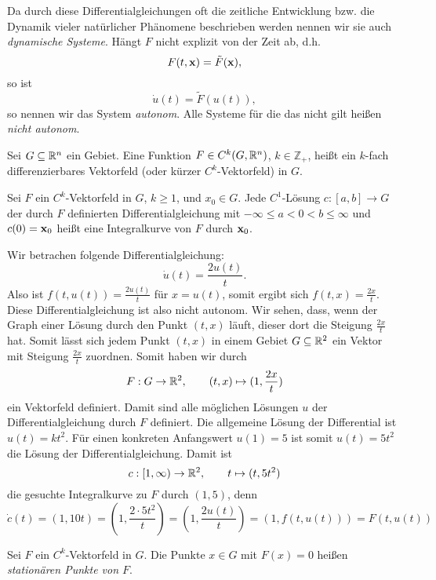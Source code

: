 \documentclass[
pdftex,
oneside,
headsepline,
11pt, 
]{scrreprt}
\begin{document}
\begin{de}
	Da durch diese Differentialgleichungen oft die zeitliche Entwicklung bzw. die Dynamik vieler natürlicher Phänomene beschrieben werden nennen wir sie auch \textit{dynamische Systeme}. Hängt $F$ nicht explizit von der Zeit ab, d.h. \[ F(t,\textnormal{\textbf{x}})=\tilde{F}(\textnormal{\textbf{x}}), \] so ist \[ \dot{u}(t)=\tilde{F}(u(t)),  \] so nennen wir das System \textit{autonom}. Alle Systeme für die das nicht gilt heißen \textit{nicht autonom}.
\end{de}
\begin{de}[$C^k$-Vektorfeld]
	Sei $G\subseteq \mathbb{R}^n$ ein Gebiet. Eine Funktion $F\in C^k(G,\mathbb{R}^n)$, $k\in \mathbb{Z}_+$, heißt ein $k$-fach differenzierbares Vektorfeld (oder kürzer $C^k$-Vektorfeld) in $G$.
\end{de}
\begin{de}[Integralkurve]
Sei $F$ ein $C^k$-Vektorfeld in $G$, $k\geq 1$, und $x_0\in G$. Jede $C^1$-Lösung $c:[a,b]\to G$ der durch $F$ definierten Differentialgleichung mit $-\infty\leq a<0<b\leq \infty$ und $c(0)=\textnormal{\textbf{x}}_0$ heißt eine Integralkurve von $F$ durch $\textnormal{\textbf{x}}_0$.
\end{de}
\begin{bsp}
	Wir betrachen folgende Differentialgleichung:
	\[  \dot{u}(t)= \frac{2u(t)}{t}.\] Also ist $f(t,u(t))=\frac{2u(t)}{t}$ für $x=u(t)$, somit ergibt sich $f(t,x)=\frac{2x}{t}$. Diese Differentialgleichung ist also nicht autonom. Wir sehen, dass, wenn der Graph einer Lösung durch den Punkt $(t,x)$ läuft, dieser dort die Steigung $\frac{2x}{t}$ hat. Somit lässt sich jedem Punkt $(t,x)$ in einem Gebiet $G\subseteq\mathbb{R}^2$ ein Vektor mit Steigung $\frac{2x}{t}$ zuordnen. Somit haben wir durch \[F:G\to \mathbb{R}^2,\qquad (t,x)\mapsto (1,\frac{2x}{t})\] ein Vektorfeld definiert. Damit sind alle möglichen Lösungen $u$ der Differentialgleichung durch $F$ definiert. Die allgemeine Lösung der Differential ist $u(t)=kt^2$. Für einen konkreten Anfangswert $u(1)=5$ ist somit $u(t)=5t^2$ die Lösung der Differentialgleichung. Damit ist \[ c:[1,\infty)\to \mathbb{R}^2,\qquad t\mapsto (t,5t^2) \] die gesuchte Integralkurve zu $F$ durch $(1,5)$, denn \[ \dot{c}(t)=(1,10t)=(1,\frac{2\cdot 5t^2}{t})=(1,\frac{2u(t)}{t})=(1,f(t,u(t)))=F(t,u(t)) \]
\end{bsp}
\begin{de}
	Sei $F$ ein $C^k$-Vektorfeld in $G$. Die Punkte $x\in G$ mit $F(x)=0$ heißen \textit{stationären Punkte von $F$}.
\end{de}
\end{document}
